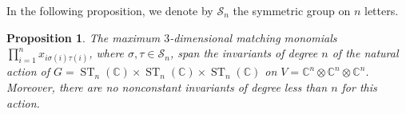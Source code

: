 \documentclass[10pt,a4paper]{article}
\newtheorem{proposition}[theorem]{Proposition}
\newcommand{\C}{\mathbb C}
\newcommand{\ST}{\operatorname{ST}}
\begin{document}
%
%
%
%

%
%
%
%
%
%

%
%
%
%
%
%
%
%

\noindent
In the following proposition, we denote by $\mathcal{S}_n$ the symmetric group on $n$ letters.


\begin{proposition}\label{prop:least-degree-torus}
	The maximum $3$-dimensional matching monomials  $\prod_{i=1}^n x_{i \sigma(i) \tau(i)}$,
	where $\sigma, \tau \in \mathcal{S}_n$, span the invariants of degree
	$n$ of the natural action of $G = \ST_n(\C) \times \ST_n(\C) \times \ST_n(\C)$
	on $V = \C^n \otimes \C^n \otimes \C^n$. Moreover, there are no nonconstant invariants of degree less than $n$ for this action.
\end{proposition}
\end{document}
